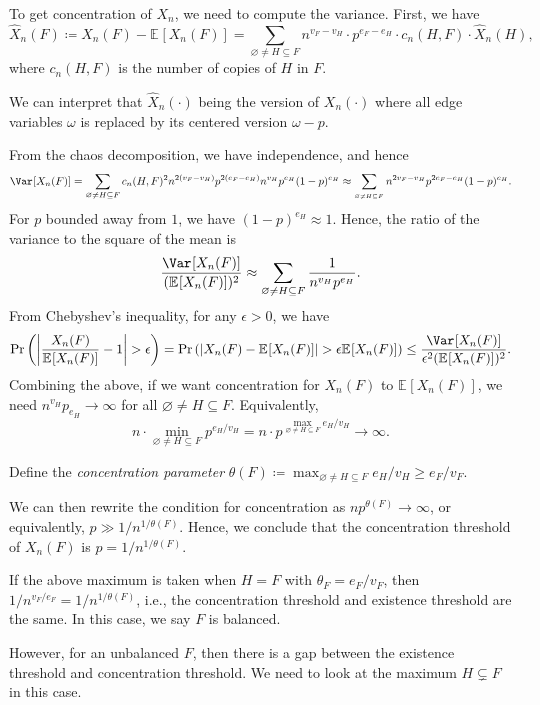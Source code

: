To get concentration of \(X_n\), we need to compute the variance. First, we have
\[
	\hat{X} _n(F)
	\coloneqq X_n(F) - \mathbb{E}_{}[X_n(F)]
	= \sum_{\varnothing \neq H \subseteq F} n^{v_F - v_H} \cdot p^{e_F - e_H} \cdot c_n(H, F) \cdot \hat{X} _n(H),
\]
where \(c_n(H, F)\) is the number of copies of \(H\) in \(F\).

\begin{note}
	We can interpret that \(\hat{X} _n(\cdot)\) being the version of \(X_n(\cdot)\) where all edge variables \(\omega \) is replaced by its centered version \(\omega - p\).
\end{note}

From the chaos decomposition, we have independence, and hence
\[
	\Var_{}[X_n(F)]
	= \sum_{\varnothing \neq H \subseteq F} c_n(H, F)^2 n^{2 (v_F - v_H)} p^{2(e_F - e_H)} n^{v_H} p^{e_H} (1 - p)^{e_H}
	\approx \sum_{_{\varnothing \neq H \subseteq F}} n^{2 v_F - v_H} p^{2 e_F - e_H} (1 - p)^{e_H}.
\]
For \(p\) bounded away from \(1\), we have \((1 - p)^{e_H} \approx 1\). Hence, the ratio of the variance to the square of the mean is
\[
	\frac{\Var_{}[X_n(F)] }{(\mathbb{E}_{}[X_n(F)] )^2}
	\approx \sum_{\varnothing \neq H \subseteq F} \frac{1}{n^{v_H} p^{e_H}}.
\]
From Chebyshev's inequality, for any \(\epsilon > 0\), we have
\[
	\Pr_{}\left(\left\lvert \frac{X_n(F)}{\mathbb{E}_{}[X_n(F)] } - 1 \right\rvert > \epsilon \right)
	= \Pr_{}\left(\lvert X_n(F) - \mathbb{E}_{}[X_n(F)] \rvert > \epsilon \mathbb{E}_{}[X_n(F)] \right)
	\leq \frac{\Var_{}[X_n(F)] }{\epsilon ^2 (\mathbb{E}_{}[X_n(F)] )^2}.
\]
Combining the above, if we want concentration for \(X_n(F)\) to \(\mathbb{E}_{}[X_n(F)]\), we need \(n^{v_H} p_{e_H} \to \infty\) for all \(\varnothing \neq H \subseteq F\). Equivalently,
\[
	n \cdot \min _{\varnothing \neq H \subseteq F} p^{e_H / v_H}
	= n \cdot p^{\max _{\varnothing \neq H \subseteq F} e_H / v_H}
	\to \infty.
\]

\begin{notation}
	Define the \emph{concentration parameter} \(\theta (F) \coloneqq \max _{\varnothing \neq H \subseteq F} e_H / v_H \geq e_F / v_F\).
\end{notation}

We can then rewrite the condition for concentration as \(n p^{\theta (F)} \to \infty \), or equivalently, \(p \gg 1 / n^{1 / \theta (F)}\). Hence, we conclude that the concentration threshold of \(X_n(F)\) is \(p = 1 / n^{1 / \theta (F)}\).

\begin{remark}
	If the above maximum is taken when \(H = F\) with \(\theta _F = e_F / v_F\), then \(1 / n^{v_F / e_F} = 1 / n^{1 / \theta (F)}\), i.e., the concentration threshold and existence threshold are the same. In this case, we say \(F\) is balanced.

	However, for an unbalanced \(F\), then there is a gap between the existence threshold and concentration threshold. We need to look at the maximum \(H \subsetneq F\) in this case.
\end{remark}


